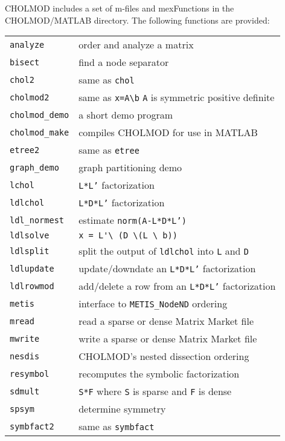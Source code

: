 \documentclass[11pt]{article}
\begin{document}
CHOLMOD includes a set of m-files and mexFunctions in the CHOLMOD/MATLAB
directory.  The following functions are provided:

\vspace{0.1in}
\begin{tabular}{ll}
\hline
{\tt analyze}       & order and analyze a matrix \\
{\tt bisect}        & find a node separator \\
{\tt chol2}         & same as {\tt chol} \\
{\tt cholmod2}      & same as \verb'x=A\b' \verb'A' is symmetric positive
                      definite \\
{\tt cholmod\_demo} & a short demo program \\
{\tt cholmod\_make} & compiles CHOLMOD for use in MATLAB \\
{\tt etree2}        & same as {\tt etree} \\
{\tt graph\_demo}   & graph partitioning demo \\
{\tt lchol}         & {\tt L*L'} factorization \\
{\tt ldlchol}       & {\tt L*D*L'} factorization \\
{\tt ldl\_normest}  & estimate {\tt norm(A-L*D*L')} \\
{\tt ldlsolve}      & \verb"x = L'\ (D \(L \ b))" \\
{\tt ldlsplit}      & split the output of {\tt ldlchol} into {\tt L} and
                        {\tt D} \\
{\tt ldlupdate}     & update/downdate an {\tt L*D*L'} factorization \\
{\tt ldlrowmod}     & add/delete a row from an {\tt L*D*L'} factorization \\
{\tt metis}         & interface to {\tt METIS\_NodeND} ordering \\
{\tt mread}         & read a sparse or dense Matrix Market file \\
{\tt mwrite}        & write a sparse or dense Matrix Market file \\
{\tt nesdis}        & CHOLMOD's nested dissection ordering \\
{\tt resymbol}      & recomputes the symbolic factorization \\
{\tt sdmult}        & {\tt S*F} where {\tt S} is sparse and {\tt F} is dense \\
{\tt spsym}         & determine symmetry \\
{\tt symbfact2}     & same as {\tt symbfact} \\
\hline
\end{tabular}
\end{document}
